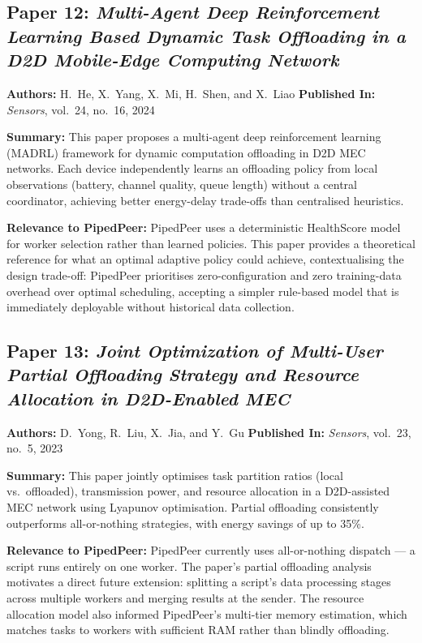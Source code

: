 \subsection*{Paper 12: \textit{Multi-Agent Deep Reinforcement Learning Based Dynamic
Task Offloading in a D2D Mobile-Edge Computing Network}}
\textbf{Authors:} H.~He, X.~Yang, X.~Mi, H.~Shen, and X.~Liao \quad
\textbf{Published In:} \textit{Sensors}, vol.~24, no.~16, 2024~\cite{he2024}

\noindent\textbf{Summary:}
This paper proposes a multi-agent deep reinforcement learning (MADRL) framework for
dynamic computation offloading in D2D MEC networks. Each device independently learns
an offloading policy from local observations (battery, channel quality, queue length)
without a central coordinator, achieving better energy-delay trade-offs than
centralised heuristics.

\noindent\textbf{Relevance to PipedPeer:}
PipedPeer uses a deterministic HealthScore model for worker selection rather than
learned policies. This paper provides a theoretical reference for what an optimal
adaptive policy could achieve, contextualising the design trade-off: PipedPeer
prioritises zero-configuration and zero training-data overhead over optimal
scheduling, accepting a simpler rule-based model that is immediately deployable
without historical data collection.

\subsection*{Paper 13: \textit{Joint Optimization of Multi-User Partial Offloading
Strategy and Resource Allocation in D2D-Enabled MEC}}
\textbf{Authors:} D.~Yong, R.~Liu, X.~Jia, and Y.~Gu \quad
\textbf{Published In:} \textit{Sensors}, vol.~23, no.~5, 2023~\cite{yong2023}

\noindent\textbf{Summary:}
This paper jointly optimises task partition ratios (local vs.\ offloaded), transmission
power, and resource allocation in a D2D-assisted MEC network using Lyapunov
optimisation. Partial offloading consistently outperforms all-or-nothing strategies,
with energy savings of up to 35\%.

\noindent\textbf{Relevance to PipedPeer:}
PipedPeer currently uses all-or-nothing dispatch — a script runs entirely on one
worker. The paper's partial offloading analysis motivates a direct future extension:
splitting a script's data processing stages across multiple workers and merging
results at the sender. The resource allocation model also informed PipedPeer's
multi-tier memory estimation, which matches tasks to workers with sufficient RAM
rather than blindly offloading.


